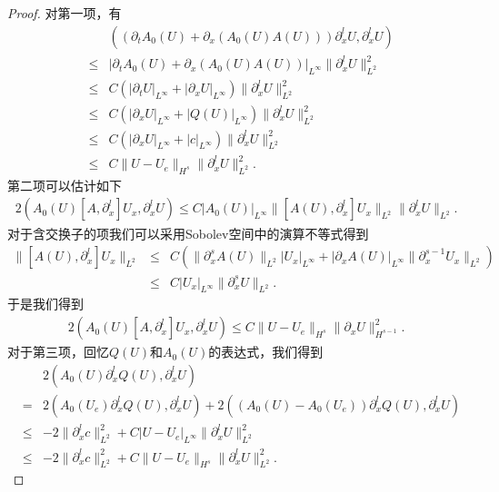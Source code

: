 \begin{proof}
对第一项，有
\begin{eqnarray}\label{HsEST:1}
  && ((\partial_t A_0(U) + \partial_x (A_0(U)A(U)))\partial^l_x U, \partial^l_x U) \nonumber\\
  &\le&|\partial_t A_0(U) + \partial_x (A_0(U)A(U))|_{L^\infty}\|\partial^l_x U\|_{L^2}^2 \nonumber\\
  &\le& C (|\partial_t U|_{L^\infty}+|\partial_x U|_{L^{\infty}})\|\partial^l_x U\|_{L^2}^2 \nonumber \\
  &\le& C (|\partial_x U|_{L^\infty}+|Q(U)|_{L^\infty})\|\partial^l_x U\|_{L^2}^2\nonumber\\
  &\le& C (|\partial_x U|_{L^\infty} + |c|_{L^\infty}) \|\partial^l_x U\|_{L^2}^2\nonumber \\
  &\le& C \|U-U_e\|_{H^s} \|\partial^l_x U\|_{L^2}^2. %
\end{eqnarray}
第二项可以估计如下
\begin{eqnarray*}
  2(A_0(U) [A,\partial^l_x] U_x, \partial^l_x U) \le C |A_0(U)|_{L^\infty} \|[A(U),\partial^l_x] U_x\|_{L^2} \|\partial^l_x U\|_{L^2}.
\end{eqnarray*}
对于含交换子的项我们可以采用Sobolev空间中的演算不等式\cite{majda1984compressible}得到
\begin{eqnarray*}
  \|[A(U),\partial^l_x] U_x\|_{L^2} &\le& C (\|\partial_x^s A(U)\|_{L^2}|U_x|_{L^\infty} + |\partial_x A(U)|_{L^{\infty}} \|\partial_x^{s-1} U_x\|_{L^2})  \\
  &\le& C|U_x|_{L^\infty} \|\partial_x^s U\|_{L^2}.
\end{eqnarray*}
于是我们得到
\begin{eqnarray}\label{HsEST:2}
  2(A_0(U) [A,\partial_x^l] U_x,\partial^l_x U) \le C \|U-U_e\|_{H^s}\|\partial_x U\|_{H^{s-1}}^2.
\end{eqnarray}
对于第三项，回忆$Q(U)$和$A_0(U)$的表达式，我们得到
\begin{eqnarray}\label{HsEST:3}
&& 2(A_0(U)\partial^l_x Q(U),\partial^l_x U) \nonumber \\
&=& 2( A_0(U_e)\partial^l_x Q(U),\partial^l_x U) + 2((A_0(U)-A_0(U_e)) \partial^l_x Q(U),\partial^l_x U) \nonumber \\
&\le&  -2 \|\partial^l_x c\|_{L^2}^2 + C|U-U_e|_{L^\infty} \|\partial^l_x U\|_{L^2}^2 \nonumber \\
&\le& -2 \|\partial^l_x c\|_{L^2}^2 + C\|U-U_e\|_{H^s} \|\partial^l_x U\|_{L^2}^2.
\end{eqnarray}


\end{proof}
